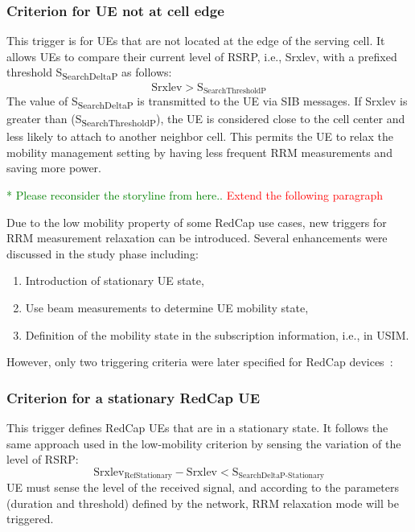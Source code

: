 \documentclass[]{IEEEtran}
\newcommand{\CAREPL}[2]{\textcolor{red}{#1}\textcolor{green}{#2}}
\begin{document}
\subsubsection*{\textbf{Criterion for UE not at cell edge}}
This trigger is for UEs that are not located at the edge of the serving cell.
It allows UEs to compare their current level of RSRP, i.e., Srxlev, with a prefixed threshold S\textsubscript{SearchDeltaP} as follows:
\begin{equation}
\textrm{Srxlev}>\textrm{S}_{\textrm{SearchThresholdP}}
\label{equ:not-at-the-edge-criterion}
\end{equation}
The value of S\textsubscript{SearchDeltaP} is transmitted to the UE via SIB messages.
If Srxlev is greater than (S\textsubscript{SearchThresholdP}), the UE is considered close to the cell center and less likely to attach to another neighbor cell.
This permits the UE to relax the mobility management setting by having less frequent RRM measurements and saving more power.

\CAREPL{}{* Please reconsider the storyline from here..}
\textcolor{red}{Extend the following paragraph}

Due to the low mobility property of some RedCap use cases, new triggers for RRM measurement relaxation can be introduced. Several enhancements were discussed in the study phase including:
\begin{enumerate}
    \item Introduction of stationary UE state,
    \item Use beam measurements to determine UE mobility state,
    \item Definition of the mobility state in the subscription information, i.e., in USIM.
\end{enumerate}
However, only two triggering criteria were later specified for RedCap devices~\cite{3gpp_nr_2022-10_38.304}:

\subsubsection*{\textbf{Criterion for a stationary RedCap UE}}
This trigger defines RedCap UEs that are in a stationary state.
It follows the same approach used in the low-mobility criterion by sensing the variation of the level of RSRP:
\begin{equation}
\textrm{Srxlev}_{\textrm{RefStationary}}-\textrm{Srxlev}<\textrm{S}_{\textrm{SearchDeltaP-Stationary}}
\label{equ:stationary-criterion}
\end{equation}
UE must sense the level of the received signal, and according to the parameters (duration and threshold) defined by the network, RRM relaxation mode will be triggered. 
\end{document}

